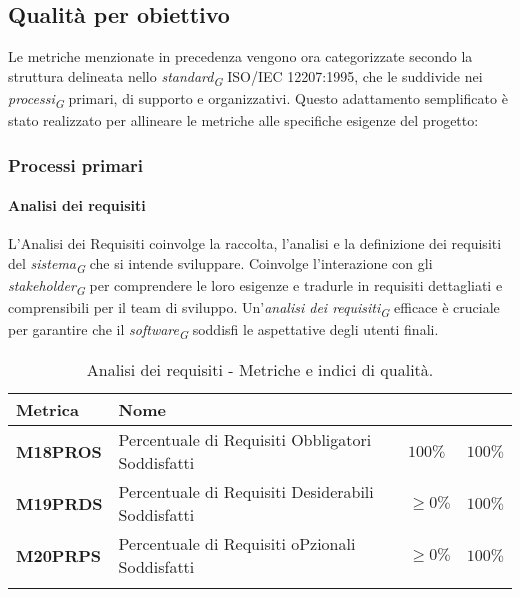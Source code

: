 \subsection{Qualità per obiettivo}
Le metriche menzionate in precedenza vengono ora categorizzate secondo la struttura delineata nello \textit{standard}\textsubscript{\textit{G}} ISO/IEC 12207:1995, che le suddivide nei \textit{processi}\textsubscript{\textit{G}} primari, di supporto e organizzativi. Questo adattamento semplificato è stato realizzato per allineare le metriche alle specifiche esigenze del progetto:

\subsubsection{Processi primari}
\paragraph{Analisi dei requisiti}
L'Analisi dei Requisiti coinvolge la raccolta, l'analisi e la definizione dei requisiti del \textit{sistema}\textsubscript{\textit{G}} che si intende sviluppare. Coinvolge l'interazione con gli \textit{stakeholder}\textsubscript{\textit{G}} per comprendere le loro esigenze e tradurle in requisiti dettagliati e comprensibili per il team di sviluppo. Un'\textit{analisi dei requisiti}\textsubscript{\textit{G}} efficace è cruciale per garantire che il \textit{software}\textsubscript{\textit{G}} soddisfi le aspettative degli utenti finali.
\hspace{1pt}
    \begin{longtable}{|C{1.5cm}|L{3cm}|L{2.5cm}|L{2.5cm}|}
        \hline
        \textbf{Metrica} & \textbf{Nome} & \textbf{} & \textbf{} \\
        \hline\textbf{M18PROS} & Percentuale di Requisiti Obbligatori Soddisfatti & $ 100\%$  & $ 100\%$ \\
        \hline
        \textbf{M19PRDS} & Percentuale di Requisiti Desiderabili Soddisfatti & $\geq 0\%$ & $100\%$ \\
        \hline
        \textbf{M20PRPS} & Percentuale di Requisiti oPzionali Soddisfatti & $\geq 0\%$ & $100\%$ \\
        \hline
    \caption{Analisi dei requisiti - Metriche e indici di qualità.}
    \label{tab:analisi_requisiti_progetto}
\end{longtable}

